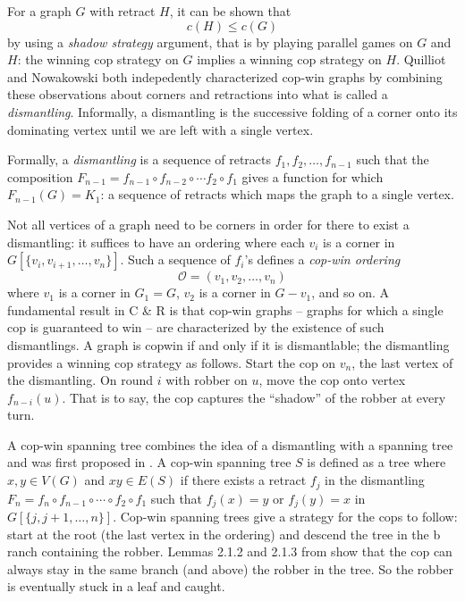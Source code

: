 For a graph $G$ with retract $H$, it can be shown \cite{berarducci1993cop} that
\[ c(H) \leq c(G) \]
by using a \textit{shadow strategy} argument, that is by playing parallel games on $G$ and $H$: the winning cop strategy on $G$ implies a winning cop strategy on $H$. Quilliot and Nowakowski both indepedently characterized cop-win graphs by combining these observations about corners and retractions into what is called a \textit{dismantling}. Informally, a dismantling is the successive folding of a corner onto its dominating vertex until we are left with a single vertex.

Formally, a \textit{dismantling} is a sequence of retracts $f_1, f_2, \dots, f_{n-1}$ such that the
composition $F_{n-1} = f_{n-1} \circ f_{n-2} \circ \cdots f_2 \circ f_1$ gives a
function for which $F_{n-1} (G) = K_1$: a sequence of retracts
which maps the graph to a single vertex.

Not all vertices of a graph need to be corners in order for there
to exist a dismantling: it suffices to have an ordering where each $v_i$ is a corner in
$G[\{v_i, v_{i+1}, \dots, v_n\}]$. Such a sequence of $f_i$'s defines a \textit{cop-win ordering}
\[ \mathcal{O} = ( v_1, v_2, \dots, v_n ) \]
where $v_1$ is a corner in $G_1 = G$, $v_2$ is a corner in $G - v_1$, and so on. A fundamental result in C \& R is that cop-win graphs -- graphs for which a single
cop is guaranteed to win --  are characterized by the existence of such dismantlings.
A graph is copwin if and only if it is dismantlable; the dismantling provides a winning cop strategy as follows. Start the cop on $v_n$, the last vertex of the dismantling. On round $i$ with robber on $u$, move the cop onto vertex $f_{n-i}(u)$. That is to say, the cop captures the ``shadow'' of the robber at every turn.

A cop-win spanning tree combines the idea of a dismantling with a spanning tree
and was first proposed in \cite{clarke2002constrained}. A cop-win spanning tree $S$ is defined as a tree where $x,y\in V(G)$ and $xy \in E(S)$ if there exists a retract $f_j$ in the dismantling
$F_n = f_{n} \circ f_{n-1} \circ \cdots \circ f_{2} \circ f_1$ such that $f_j (x) = y$ or $f_j (y) = x$ in $G[\{j, j+1, \dots, n \}]$. Cop-win spanning trees give a strategy for the cops to follow: start at the root
(the last vertex in the ordering) and descend the tree in the b ranch containing the robber.
Lemmas 2.1.2 and 2.1.3 from \cite{clarke2002constrained} show that the cop
can always stay in the same branch (and above) the robber in the tree. So the
robber is eventually stuck in a leaf and caught.

